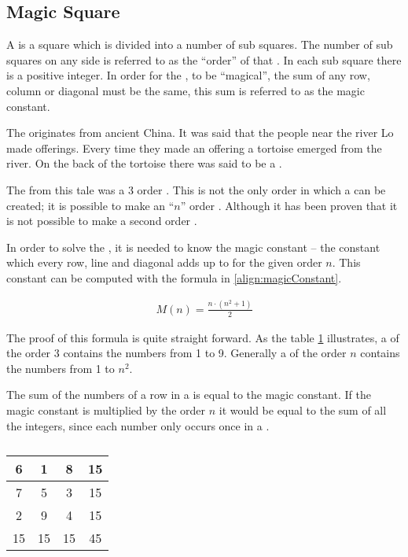 \subsection{Magic Square}
\label{sec:magicSquare}
A \msquare{} is a square which is divided into a number of sub squares. The number of sub squares on any side is referred to as the ``order'' of that \msquare{}. In each sub square there is a positive integer. In order for the \msquare{}, to be ``magical'', the sum of any row, column or diagonal must be the same, this sum is referred to as the magic constant.

The \msquare{}\cite{aiden06} originates from ancient China. It was said that the people near the river Lo made offerings. Every time they made an offering a tortoise emerged from the river. On the back of the tortoise there was said to be a \msquare{}.

The \msquare{} from this tale was a 3 order \msquare{}. This is not the only order in which a \msquare{} can be created; it is possible to make an ``$n$'' order \msquare{}. Although it has been proven that it is not possible to make a second order \msquare{}.

In order to solve the \msquare{}, it is needed to know the magic constant -- the constant which every row, line and diagonal adds up to for the given order $n$. This constant can be computed with the formula in \ref{align:magicConstant}.

\begin{align}
\label{align:magicConstant}
	M(n) = \frac{n \cdot (n^2+1)}{2}
\end{align}

The proof of this formula is quite straight forward. As the table \ref{tab:magicSquareOrder3} illustrates, a \msquare{} of the order 3 contains the numbers from 1 to 9. Generally a \msquare{} of the order $n$ contains the numbers from 1 to $n^2$.

The sum of the numbers of a row in a \msquare{} is equal to the magic constant. If the magic constant is multiplied by the order $n$ it would be equal to the sum of all the integers, since each number only occurs once in a \msquare{}.

\renewcommand{\arraystretch}{1.3}
\begin{table}[h]
	\centering
		\begin{tabular}{|c|c|c |@{\vrules}| c|}
			\hline
			6&1&8&15 \\
			\hline
			7&5&3&15 \\
			\hline
			2&9&4&15 \\
			\noalign{\hrules}
			15&15&15&45 \\
			\hline
		\end{tabular}
	\caption{}
	\label{tab:magicSquareOrder3}
\end{table}

